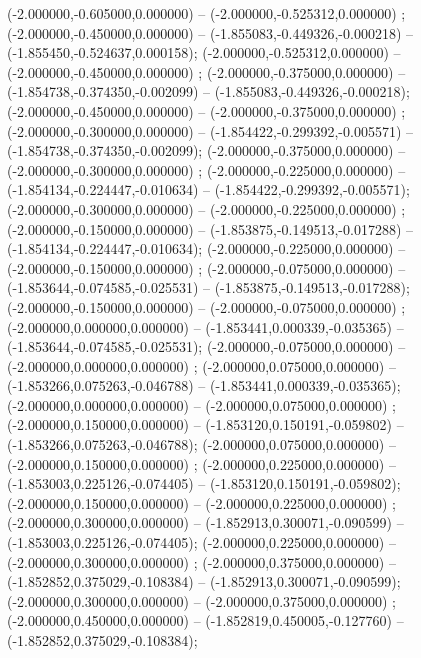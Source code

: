  (-2.000000,-0.605000,0.000000) -- (-2.000000,-0.525312,0.000000) ;
 (-2.000000,-0.450000,0.000000) -- (-1.855083,-0.449326,-0.000218) -- (-1.855450,-0.524637,0.000158);
 (-2.000000,-0.525312,0.000000) -- (-2.000000,-0.450000,0.000000) ;
 (-2.000000,-0.375000,0.000000) -- (-1.854738,-0.374350,-0.002099) -- (-1.855083,-0.449326,-0.000218);
 (-2.000000,-0.450000,0.000000) -- (-2.000000,-0.375000,0.000000) ;
 (-2.000000,-0.300000,0.000000) -- (-1.854422,-0.299392,-0.005571) -- (-1.854738,-0.374350,-0.002099);
 (-2.000000,-0.375000,0.000000) -- (-2.000000,-0.300000,0.000000) ;
 (-2.000000,-0.225000,0.000000) -- (-1.854134,-0.224447,-0.010634) -- (-1.854422,-0.299392,-0.005571);
 (-2.000000,-0.300000,0.000000) -- (-2.000000,-0.225000,0.000000) ;
 (-2.000000,-0.150000,0.000000) -- (-1.853875,-0.149513,-0.017288) -- (-1.854134,-0.224447,-0.010634);
 (-2.000000,-0.225000,0.000000) -- (-2.000000,-0.150000,0.000000) ;
 (-2.000000,-0.075000,0.000000) -- (-1.853644,-0.074585,-0.025531) -- (-1.853875,-0.149513,-0.017288);
 (-2.000000,-0.150000,0.000000) -- (-2.000000,-0.075000,0.000000) ;
 (-2.000000,0.000000,0.000000) -- (-1.853441,0.000339,-0.035365) -- (-1.853644,-0.074585,-0.025531);
 (-2.000000,-0.075000,0.000000) -- (-2.000000,0.000000,0.000000) ;
 (-2.000000,0.075000,0.000000) -- (-1.853266,0.075263,-0.046788) -- (-1.853441,0.000339,-0.035365);
 (-2.000000,0.000000,0.000000) -- (-2.000000,0.075000,0.000000) ;
 (-2.000000,0.150000,0.000000) -- (-1.853120,0.150191,-0.059802) -- (-1.853266,0.075263,-0.046788);
 (-2.000000,0.075000,0.000000) -- (-2.000000,0.150000,0.000000) ;
 (-2.000000,0.225000,0.000000) -- (-1.853003,0.225126,-0.074405) -- (-1.853120,0.150191,-0.059802);
 (-2.000000,0.150000,0.000000) -- (-2.000000,0.225000,0.000000) ;
 (-2.000000,0.300000,0.000000) -- (-1.852913,0.300071,-0.090599) -- (-1.853003,0.225126,-0.074405);
 (-2.000000,0.225000,0.000000) -- (-2.000000,0.300000,0.000000) ;
 (-2.000000,0.375000,0.000000) -- (-1.852852,0.375029,-0.108384) -- (-1.852913,0.300071,-0.090599);
 (-2.000000,0.300000,0.000000) -- (-2.000000,0.375000,0.000000) ;
 (-2.000000,0.450000,0.000000) -- (-1.852819,0.450005,-0.127760) -- (-1.852852,0.375029,-0.108384);
